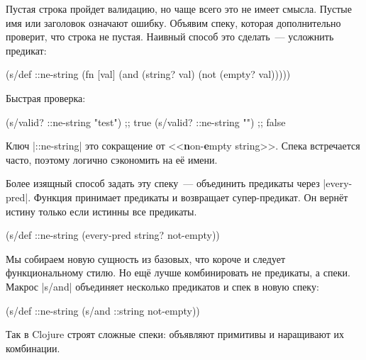 Пустая строка пройдет валидацию, но чаще всего это не имеет смысла. Пустые имя
или заголовок означают ошибку. Объявим спеку, которая дополнительно проверит,
что строка не пустая. Наивный способ это сделать~--- усложнить предикат:


\begin{english}
  \begin{clojure}
(s/def ::ne-string
  (fn [val]
    (and (string? val)
         (not (empty? val)))))
  \end{clojure}
\end{english}

\noindent
Быстрая проверка:

\begin{english}
  \begin{clojure}
(s/valid? ::ne-string "test") ;; true
(s/valid? ::ne-string "")     ;; false
  \end{clojure}
\end{english}

Ключ \spverb|::ne-string| это сокращение от <<\textbf{n}on-\textbf{e}mpty
string>>. Спека встречается часто, поэтому логично сэкономить на е\"{е} имени.

Более изящный способ задать эту спеку~--- объединить предикаты через
\spverb|every-pred|. Функция принимает предикаты и возвращает супер-предикат. Он
верн\"{е}т истину только если истинны все предикаты.

\begin{english}
  \begin{clojure}
(s/def ::ne-string
  (every-pred string? not-empty))
  \end{clojure}
\end{english}


Мы собираем новую сущность из базовых, что короче и следует функциональному
стилю. Но ещ\"{е} лучше комбинировать не предикаты, а спеки. Макрос \spverb|s/and|
объединяет несколько предикатов и спек в новую спеку:

\begin{english}
  \begin{clojure}
(s/def ::ne-string
  (s/and ::string not-empty))
  \end{clojure}
\end{english}

Так в Clojure строят сложные спеки: объявляют примитивы и наращивают их
комбинации.

